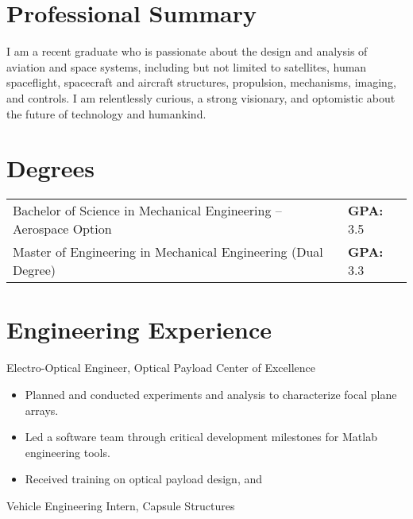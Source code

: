 \documentclass[10pt,final,sans]{resume}
\begin{document}
\setlength\headheight{28pt} %

\section{Professional Summary}
I am a recent graduate who is passionate about the design and analysis of
aviation and space systems, including but not limited to satellites, human
spaceflight, spacecraft and aircraft structures, propulsion, mechanisms,
imaging, and controls. I am relentlessly curious, a strong visionary, and
optomistic about the future of technology and humankind.

\section{Degrees}
\begin{tabular}{ll}
Bachelor of Science in Mechanical Engineering -- Aerospace Option & {\small {\bf GPA: } 3.5} \\
Master of Engineering in Mechanical Engineering (Dual Degree) & {\small {\bf GPA: } 3.3} \\
\end{tabular}

\section{Engineering Experience}
Electro-Optical Engineer, Optical Payload Center of Excellence
\begin{itemize}
  \item Planned and conducted experiments and analysis to characterize focal plane arrays.
  \item Led a software team through critical development milestones for Matlab engineering tools. 
  \item Received training on optical payload design, and 
\end{itemize} 
Vehicle Engineering Intern, Capsule Structures
\end{document}
